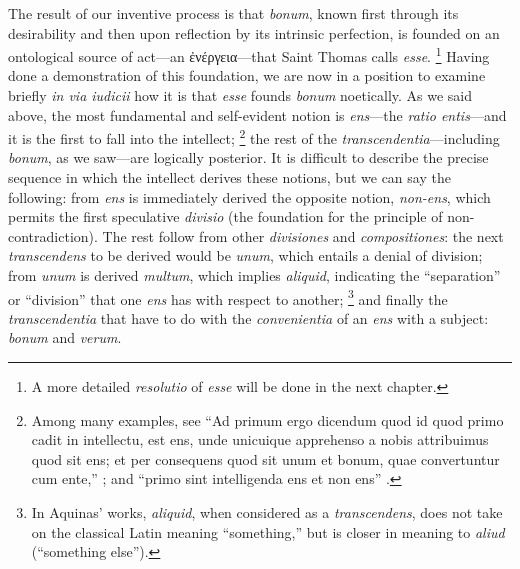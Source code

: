 The result of our inventive process is that \emph{bonum}, known first through its desirability and then upon reflection by its intrinsic perfection, is founded on an ontological source of act—an ἐνέργεια—that Saint Thomas calls \emph{esse}.%
%
\footnote{A more detailed \emph{resolutio} of \emph{esse} will be done in the next chapter.} Having done a demonstration of this foundation, we are now in a position to examine briefly \emph{in via iudicii} how it is that \emph{esse} founds \emph{bonum} noetically. As we said above, the most fundamental and self-evident notion is \emph{ens}—the \emph{ratio entis}—and it is the first to fall into the intellect;%
%
\footnote{Among many examples, see “Ad primum ergo dicendum quod id quod primo cadit in intellectu, est ens, unde unicuique apprehenso a nobis attribuimus quod sit ens; et per consequens quod sit unum et bonum, quae convertuntur cum ente,” \parencite[I-II, q.~55, a.~4, ad 1]{st:summa}; and “primo sint intelligenda ens et non ens” \parencite[pars~2, q.~4, a.~1, co.~2]{st:detrinitate}.}
%
the rest of the \emph{transcendentia}—including \emph{bonum}, as we saw—are logically posterior. It is difficult to describe the precise sequence in which the intellect derives these notions, but we can say the following: from \emph{ens} is immediately derived the opposite notion, \emph{non-ens}, which permits the first speculative \emph{divisio} (the foundation for the principle of non-contradiction). The rest follow from other \emph{divisiones} and \emph{compositiones}: the next \emph{transcendens} to be derived would be \emph{unum}, which entails a denial of division; from \emph{unum} is derived \emph{multum}, which implies \emph{aliquid}, indicating the “separation” or “division” that one \emph{ens} has with respect to another;%
%
\footnote{In Aquinas’ works, \emph{aliquid}, when considered as a \emph{transcendens}, does not take on the classical Latin meaning “something,” but is closer in meaning to \emph{aliud} (“something else”).}
%
and finally the \emph{transcendentia} that have to do with the \emph{convenientia} of an \emph{ens} with a subject: \emph{bonum} and \emph{verum}.%
%
